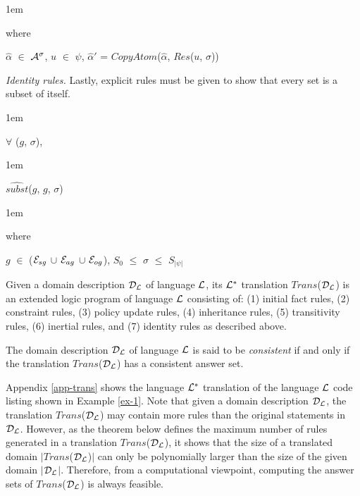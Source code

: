 \documentclass[global,twocolumn,final]{svjour}
\newenvironment{vdefinition}
  {\begin{definition}\hspace{0.25em}}
  {\end{definition}}
\newenvironment{vquote}
  {\begin{list}{}{\leftmargin 1em}\item[]}
  {\end{list}}
\begin{document}
\begin{itemize}
              \begin{vquote}
                where

                $\hat{\alpha}$ $\in$ ${\cal A}^{\sigma}$,
                $u$ $\in$ $\psi$,
                $\hat{\alpha}'$ = $CopyAtom$($\hat{\alpha}$, $Res$($u$, $\sigma$))
              \end{vquote}
            \item
              {\em Identity rules.}
              Lastly, explicit rules must be given to show that every set is
              a subset of itself.

              \begin{vquote}
                $\forall$ ($g$, $\sigma$),
              \end{vquote}

              \begin{vquote}
                $\hat{subst}$($g$, $g$, $\sigma$)
              \end{vquote}

              \begin{vquote}
                where

                $g$ $\in$ (${\cal E}_{sg}$ $\cup$ ${\cal E}_{ag}$ $\cup$ ${\cal E}_{og}$),
                $S_{0}$ $\leq$ $\sigma$ $\leq$ $S_{|\psi|}$
              \end{vquote}
          \end{itemize}

        \begin{vdefinition}
          \label{def-trans}
          Given a domain description ${\cal D_{L}}$ of language ${\cal L}$, its
          ${\cal L^{*}}$ translation $Trans$(${\cal D_{L}}$) is an extended
          logic program of language ${\cal L}$ consisting of: (1) initial fact
          rules, (2) constraint rules, (3) policy update rules, (4) inheritance
          rules, (5) transitivity rules, (6) inertial rules, and (7) identity
          rules as described above.

          The domain description ${\cal D_{L}}$ of language ${\cal L}$ is said
          to be {\em consistent} if and only if the translation
          $Trans$(${\cal D_{L}}$) has a consistent answer set.
        \end{vdefinition}

        Appendix \ref{app-trans} shows the language ${\cal L^{*}}$ translation
        of the language ${\cal L}$ code listing shown in Example \ref{ex-1}.
        Note that given a domain description ${\cal D_{L}}$, the translation
        $Trans$(${\cal D_{L}}$) may contain more rules than the original
        statements in ${\cal D_{L}}$. However, as the theorem below defines the
        maximum number of rules generated in a translation
        $Trans$(${\cal D_{L}}$), it shows that the size of a translated domain
        $|$$Trans$(${\cal D_{L}}$)$|$ can only be polynomially larger than the
        size of the given domain $|$${\cal D_{L}}$$|$. Therefore, from a
        computational viewpoint, computing the answer sets of
        $Trans$(${\cal D_{L}}$) is always feasible.
\end{document}
